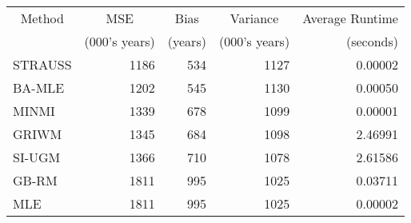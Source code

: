 
\begin{tabular}{lrrrr}
\toprule
\multicolumn{1}{c}{Method} & \multicolumn{1}{c}{MSE} & \multicolumn{1}{c}{Bias} & \multicolumn{1}{c}{Variance} & \multicolumn{1}{c}{Average Runtime} \\
\cmidrule(l{3pt}r{3pt}){1-1} \cmidrule(l{3pt}r{3pt}){2-2} \cmidrule(l{3pt}r{3pt}){3-3} \cmidrule(l{3pt}r{3pt}){4-4} \cmidrule(l{3pt}r{3pt}){5-5}
 & (000's years) & (years) & (000's years) & (seconds)\\
\midrule
STRAUSS & 1186 & 534 & 1127 & 0.00002\\
BA-MLE & 1202 & 545 & 1130 & 0.00050\\
MINMI & 1339 & 678 & 1099 & 0.00001\\
GRIWM & 1345 & 684 & 1098 & 2.46991\\
SI-UGM & 1366 & 710 & 1078 & 2.61586\\
\addlinespace
GB-RM & 1811 & 995 & 1025 & 0.03711\\
MLE & 1811 & 995 & 1025 & 0.00002\\
\bottomrule
\end{tabular}
